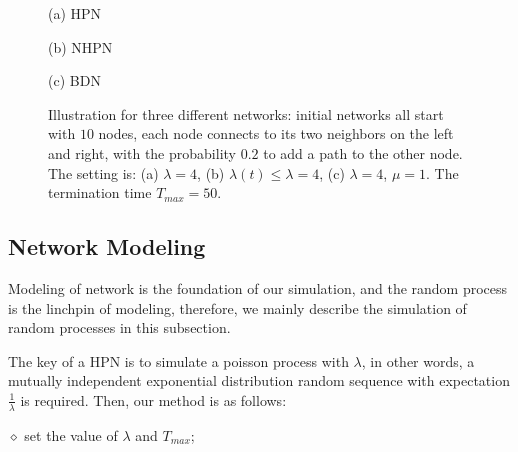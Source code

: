 \documentclass[final]{IEEEtran}
\begin{document}
\begin{figure}[t!]
\centering
\begin{minipage}[b]{0.3\linewidth}
\centering
\parbox{15.5cm}{\footnotesize \hspace{2.5cm}(a) HPN}
\end{minipage}
\begin{minipage}[b]{0.3\linewidth}
    \centering
 \parbox{15.5cm}{\footnotesize \hspace{2.4cm}(b) NHPN}
\end{minipage}
\begin{minipage}[b]{0.3\linewidth}
    \centering
 \parbox{15.5cm}{\footnotesize \hspace{2.5cm}(c) BDN}
\end{minipage}
\hspace{3ex}
 \caption{\label{f7} Illustration for three different networks: initial networks all start with
$10$ nodes, each node connects to its two neighbors on the left
and right, with the probability $0.2$ to add a path to the other
node. The setting is: (a) $\lambda=4$, (b) $\lambda (t) \leq
\lambda =4$, (c) $\lambda=4$, $\mu=1$. The termination time
$T_{max}=50$.}
\end{figure}


\subsection{Network Modeling}
Modeling of network is the foundation of our simulation, and the
random process is the linchpin of modeling, therefore, we mainly
describe the simulation of random processes in this subsection.





The key of a HPN is to simulate a poisson process with $\lambda$,
in other words, a mutually independent exponential distribution
random sequence with expectation $\frac{1}{\lambda}$ is required.
Then, our method is as follows:

\noindent$\diamond$ set the value of $\lambda$
and $T_{max}$;
\end{document}
